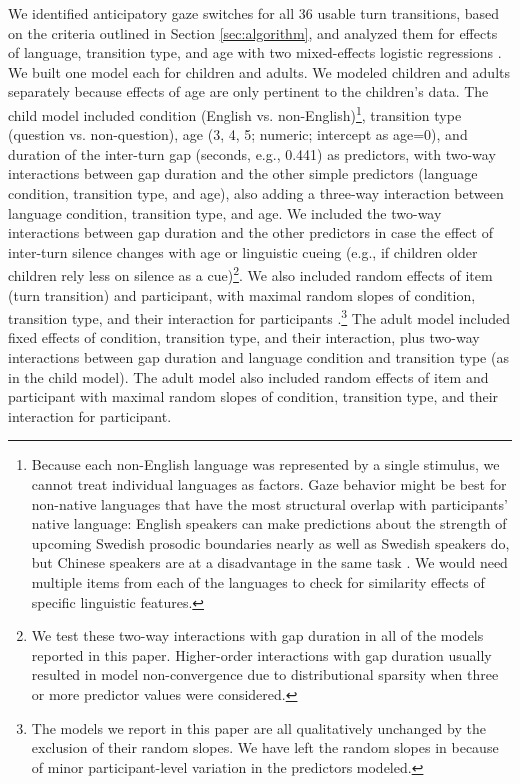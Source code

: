\documentclass[authoryear, 12pt]{elsarticle}
\begin{document}
We identified anticipatory gaze switches for all 36 usable turn transitions, based on the criteria outlined in Section \ref{sec:algorithm}, and analyzed them for effects of language, transition type, and age with two mixed-effects logistic regressions \citep{lme4, R}. We built one model each for children and adults. We modeled children and adults separately because effects of age are only pertinent to the children's data. The child model included condition (English vs. non-English)\footnote{Because each non-English language was represented by a single stimulus, we cannot treat individual languages as factors. Gaze behavior might be best for non-native languages that have the most structural overlap with participants' native language: English speakers can make predictions about the strength of upcoming Swedish prosodic boundaries nearly as well as Swedish speakers do, but Chinese speakers are at a disadvantage in the same task \citep{carlson2005}. We would need multiple items from each of the languages to check for similarity effects of specific linguistic features.}, transition type (question vs. non-question), age (3, 4, 5; numeric; intercept as age=0), and duration of the inter-turn gap (seconds, e.g., 0.441) as predictors, with two-way interactions between gap duration and the other simple predictors (language condition, transition type, and age), also adding a three-way interaction between language condition, transition type, and age.  We included the two-way interactions between gap duration and the other predictors in case the effect of inter-turn silence changes with age or linguistic cueing (e.g., if children older children rely less on silence as a cue)\footnote{We test these two-way interactions with gap duration in all of the models reported in this paper. Higher-order interactions with gap duration usually resulted in model non-convergence due to distributional sparsity when three or more predictor values were considered.}. We also included random effects of item (turn transition) and participant, with maximal random slopes of condition, transition type, and their interaction for participants \citep{barr2013}.\footnote{The models we report in this paper are all qualitatively unchanged by the exclusion of their random slopes. We have left the random slopes in because of minor participant-level variation in the predictors modeled.} The adult model included fixed effects of condition, transition type, and their interaction, plus two-way interactions between gap duration and language condition and transition type (as in the child model). The adult model also included random effects of item and participant with maximal random slopes of condition, transition type, and their interaction for participant.
\end{document}
